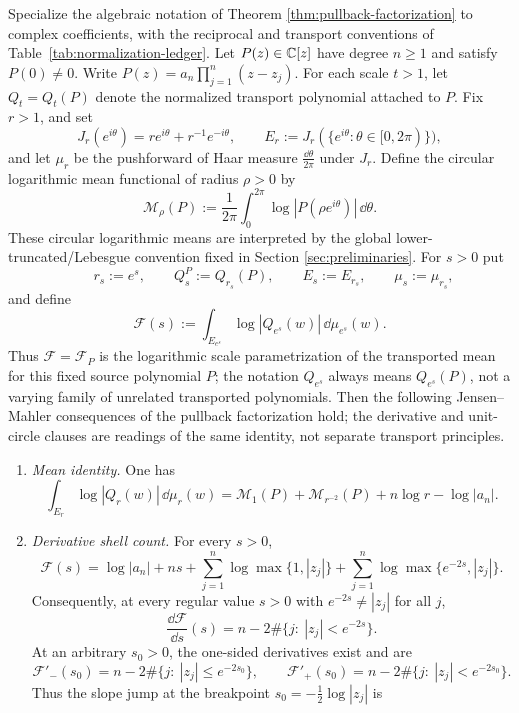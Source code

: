 \begin{theorem}\label{thm:leyang-mahler-transport}
Specialize the algebraic notation of Theorem \ref{thm:pullback-factorization} to complex coefficients, with the reciprocal and transport conventions of Table~\ref{tab:normalization-ledger}.  Let \(P(z)\in\mathbb{C}[z]\) have degree \(n\ge 1\) and satisfy \(P(0)\neq 0\).  Write \(P(z)=a_n\prod_{j=1}^{n}(z-z_j)\).  For each scale \(t>1\), let \(Q_t=Q_t(P)\) denote the normalized transport polynomial attached to \(P\).  Fix \(r>1\), and set
\[
J_r(e^{i\theta})=r e^{i\theta}+r^{-1}e^{-i\theta},
\qquad
E_r:=J_r(\{e^{i\theta}:\theta\in[0,2\pi)\}),
\]
and let \(\mu_r\) be the pushforward of Haar measure \(\frac{\dd\theta}{2\pi}\) under \(J_r\).  Define the circular logarithmic mean functional of radius \(\rho>0\) by
\[
\mathcal M_\rho(P):=\frac1{2\pi}\int_{0}^{2\pi}\log|P(\rho e^{i\theta})|\,\dd\theta.
\]
These circular logarithmic means are interpreted by the global lower-truncated/Lebesgue convention fixed in Section \ref{sec:preliminaries}.
For \(s>0\) put
\[
\qquad
r_s:=e^s,\qquad
Q_s^P:=Q_{r_s}(P),\qquad
E_s:=E_{r_s},\qquad
\mu_s:=\mu_{r_s},
\]
and define
\[
\mathcal F(s):=\int_{E_{e^s}}\log|Q_{e^s}(w)|\,\dd\mu_{e^s}(w).
\]
Thus \(\mathcal F=\mathcal F_P\) is the logarithmic scale
parametrization of the transported mean for this fixed source
polynomial \(P\); the notation \(Q_{e^s}\) always means \(Q_{e^s}(P)\),
not a varying family of unrelated transported polynomials.
Then the following Jensen--Mahler consequences of the pullback factorization hold; the derivative and unit-circle clauses are readings of the same identity, not separate transport principles.
\begin{enumerate}[label=\textup{(\alph*)}]
\item \emph{Mean identity.}  One has
\[
\boxed{\;
\int_{E_r}\log|Q_r(w)|\,\dd\mu_r(w)
=
\mathcal M_{1}(P)+\mathcal M_{r^{-2}}(P)+n\log r-\log|a_n|.
\;}
\]
\item \emph{Derivative shell count.}  For every \(s>0\),
\[
\mathcal F(s)=\log|a_n|+ns+
\sum_{j=1}^{n}\log\max\{1,|z_j|\}+
\sum_{j=1}^{n}\log\max\{e^{-2s},|z_j|\}.
\]
Consequently, at every regular value \(s>0\) with \(e^{-2s}\ne |z_j|\) for all \(j\),
\[
\frac{\dd\mathcal F}{\dd s}(s)=n-2\#\{j:\ |z_j|<e^{-2s}\}.
\]
At an arbitrary \(s_0>0\), the one-sided derivatives exist and are
\[
\mathcal F'_-(s_0)
=n-2\#\{j:\ |z_j|\le e^{-2s_0}\},
\qquad
\mathcal F'_+(s_0)
=n-2\#\{j:\ |z_j|< e^{-2s_0}\}.
\]
Thus the slope jump at the breakpoint \(s_0=-\frac12\log|z_j|\) is

\end{enumerate}
\end{theorem}
